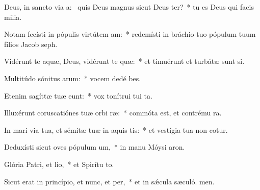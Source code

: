 \item Deus, in sancto via a:~\pscross{} quis Deus magnus sicut Deus ter?~* tu es Deus qui facis milia.
\item Notam fecísti in pópulis virtútem am:~* redemísti in bráchio tuo pópulum tuum fílios Jacob  seph.
\item Vidérunt te aquæ, Deus, vidérunt te quæ:~* et timuérunt et turbátæ sunt si.
\item Multitúdo sónitus arum:~* vocem dedé bes.
\item Etenim sagíttæ tuæ eunt:~* vox tonítrui tui  ta.
\item Illuxérunt coruscatiónes tuæ orbi ræ:~* commóta est, et contrému ra.
\item In mari via tua, et sémitæ tuæ in aquis tis:~* et vestígia tua non cotur.
\item Deduxísti sicut oves pópulum um,~* in manu Móysi  aron.
\item Glória Patri, et lio,~* et Spirítu to.
\item Sicut erat in princípio, et nunc, et per,~* et in sǽcula sæculó. men.
